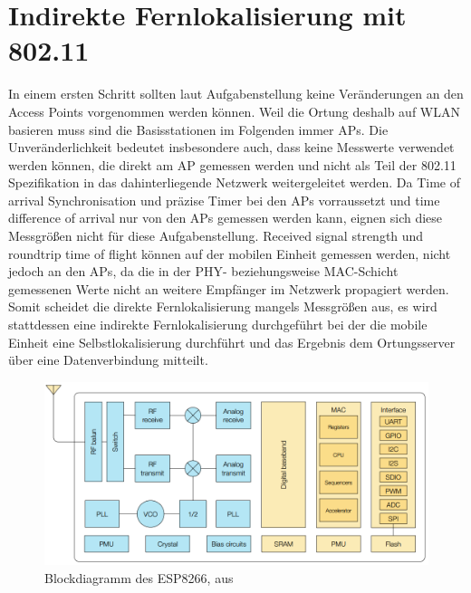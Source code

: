 \chapter{Indirekte Fernlokalisierung mit 802.11}
\label{ch:phase1}
In einem ersten Schritt sollten laut Aufgabenstellung keine Veränderungen an den Access Points vorgenommen werden können.
Weil die Ortung deshalb auf WLAN basieren muss sind die Basisstationen im Folgenden immer APs. 
Die Unveränderlichkeit bedeutet insbesondere auch, dass keine Messwerte verwendet werden können, die direkt am AP gemessen werden und nicht als Teil der 802.11 Spezifikation in das dahinterliegende Netzwerk weitergeleitet werden.
Da Time of arrival Synchronisation und präzise Timer bei den APs vorraussetzt und time difference of arrival nur von den APs gemessen werden kann, eignen sich diese Messgrößen nicht für diese Aufgabenstellung.
Received signal strength und roundtrip time of flight können auf der mobilen Einheit gemessen werden, nicht jedoch an den APs, da die in der PHY- beziehungsweise MAC-Schicht gemessenen Werte nicht an weitere Empfänger im Netzwerk propagiert werden. 
Somit scheidet die direkte Fernlokalisierung mangels Messgrößen aus, es wird stattdessen eine indirekte Fernlokalisierung durchgeführt bei der die mobile Einheit eine Selbstlokalisierung durchführt und das Ergebnis dem Ortungsserver über eine Datenverbindung mitteilt.

\begin{figure}[h]
  \centering
	\includegraphics[width=\textwidth]{images/espblock.png}
  \caption{Blockdiagramm des ESP8266, aus \cite{espressif2017esp8266}}
  \label{fig:espblock}
\end{figure}







